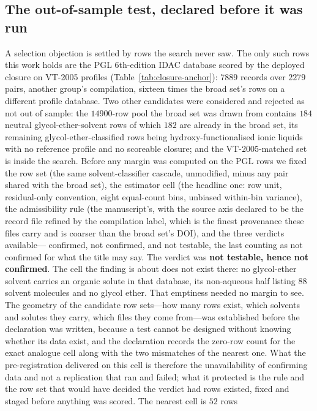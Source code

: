 \subsection{The out-of-sample test, declared before it was run}
\label{sec:si-oos}
A selection objection is settled by rows
the search never saw. The only such rows this work holds are the PGL 6th-edition IDAC database
scored by the deployed closure on VT-2005 profiles (Table~\ref{tab:closure-anchor}): $7889$ records
over $2279$ pairs, another group's compilation, sixteen times the broad set's rows on a different
profile database. Two other candidates were considered and rejected as not out of sample: the
$14900$-row pool the broad set was drawn from contains $184$ neutral glycol-ether-solvent rows of
which $182$ are already in the broad set, its remaining glycol-ether-classified rows being
hydroxy-functionalised ionic liquids with no reference profile and no scoreable closure; and the
VT-2005-matched set is inside the search. Before any margin was computed on the PGL rows we fixed
the row set (the same solvent-classifier cascade, unmodified, minus any pair shared with the
broad set), the estimator cell (the headline one: row unit, residual-only convention, eight equal-count
bins, unbiased within-bin variance), the admissibility rule (the manuscript's, with the source axis
declared to be the record file refined by the compilation label, which is the finest provenance
these files carry and is coarser than the broad set's DOI), and the three verdicts available---
confirmed, not confirmed, and not testable, the last counting as not confirmed for what the title
may say. The verdict was \textbf{not testable, hence not confirmed}. The cell the finding is about
does not exist there: no glycol-ether solvent carries an organic solute in that database, its
non-aqueous half listing $88$ solvent molecules and no glycol ether. That emptiness needed no
margin to see. The geometry of the candidate row sets---how many rows exist, which solvents and
solutes they carry, which files they come from---was established before the declaration was
written, because a test cannot be designed without knowing whether its data exist, and the
declaration records the zero-row count for the exact analogue cell along with the two mismatches
of the nearest one. What the pre-registration delivered on this cell is therefore the
unavailability of confirming data and not a replication that ran and failed; what it protected is
the rule and the row set that would have decided the verdict had rows existed, fixed and staged
before anything was scored. The nearest cell is $52$ rows
